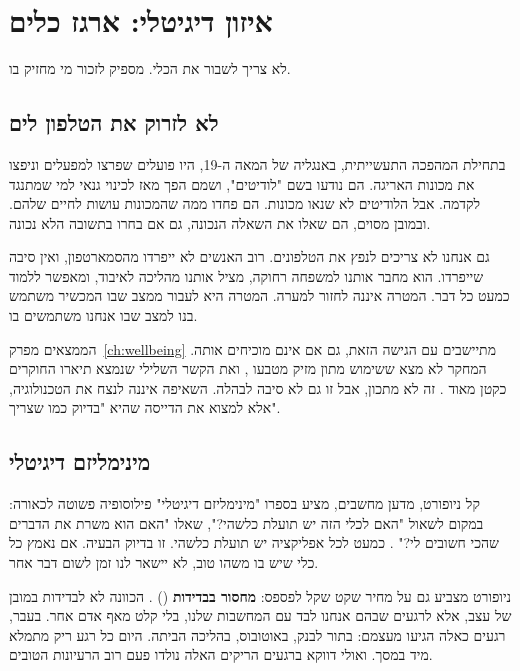 \chapter{איזון דיגיטלי: ארגז כלים}

\begin{epigraph}{}
לא צריך לשבור את הכלי. מספיק לזכור מי מחזיק בו.
\end{epigraph}

\section{לא לזרוק את הטלפון לים}

בתחילת המהפכה התעשייתית, באנגליה של המאה ה-19, היו פועלים שפרצו למפעלים וניפצו את מכונות האריגה. הם נודעו בשם "לודיטים", ושמם הפך מאז לכינוי גנאי למי שמתנגד לקדמה. אבל הלודיטים לא שנאו מכונות. הם פחדו ממה שהמכונות עושות לחיים שלהם. ובמובן מסוים, הם שאלו את השאלה הנכונה, גם אם בחרו בתשובה הלא נכונה.

גם אנחנו לא צריכים לנפץ את הטלפונים. רוב האנשים לא ייפרדו מהסמארטפון, ואין סיבה שייפרדו. הוא מחבר אותנו למשפחה רחוקה, מציל אותנו מהליכה לאיבוד, ומאפשר ללמוד כמעט כל דבר. המטרה איננה לחזור למערה. המטרה היא לעבור ממצב שבו המכשיר משתמש בנו למצב שבו אנחנו משתמשים בו.

הממצאים מפרק~\ref{ch:wellbeing} מתיישבים עם הגישה הזאת, גם אם אינם מוכיחים אותה. המחקר לא מצא ששימוש מתון מזיק מטבעו \parencite{przybylski2017}, ואת הקשר השלילי שנמצא תיארו החוקרים כקטן מאוד \parencite{orben2019}. זה לא מתכון, אבל זו גם לא סיבה לבהלה. השאיפה איננה לנצח את הטכנולוגיה, אלא למצוא את הדייסה שהיא "בדיוק כמו שצריך".

\section{מינימליזם דיגיטלי}

קל ניופורט, מדען מחשבים, מציע בספרו "מינימליזם דיגיטלי" פילוסופיה פשוטה לכאורה: במקום לשאול "האם לכלי הזה יש תועלת כלשהי?", שאלו "האם הוא משרת את הדברים שהכי חשובים לי?" \parencite{newport2019}. כמעט לכל אפליקציה יש תועלת כלשהי. זו בדיוק הבעיה. אם נאמץ כל כלי שיש בו משהו טוב, לא יישאר לנו זמן לשום דבר אחר.

ניופורט מצביע גם על מחיר שקט שקל לפספס: \textbf{מחסור בבדידות} () \parencite{newport2019}. הכוונה לא לבדידות במובן של עצב, אלא לרגעים שבהם אנחנו לבד עם המחשבות שלנו, בלי קלט מאף אדם אחר. בעבר, רגעים כאלה הגיעו מעצמם: בתור לבנק, באוטובוס, בהליכה הביתה. היום כל רגע ריק מתמלא מיד במסך. ואולי דווקא ברגעים הריקים האלה נולדו פעם רוב הרעיונות הטובים.

